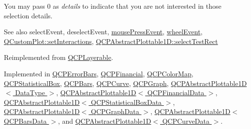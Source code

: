 You may pass 0 as {\itshape details} to indicate that you are not interested in those selection details.

\begin{DoxySeeAlso}{See also}
select\+Event, deselect\+Event, \hyperlink{classQCPLayerable_af6567604818db90f4fd52822f8bc8376}{mouse\+Press\+Event}, \hyperlink{classQCPLayerable_a47dfd7b8fd99c08ca54e09c362b6f022}{wheel\+Event}, \hyperlink{classQCustomPlot_a5ee1e2f6ae27419deca53e75907c27e5}{Q\+Custom\+Plot\+::set\+Interactions}, \hyperlink{classQCPAbstractPlottable1D_a22377bf6e57ab7eedbc9e489250c6ded}{Q\+C\+P\+Abstract\+Plottable1\+D\+::select\+Test\+Rect} 
\end{DoxySeeAlso}


Reimplemented from \hyperlink{classQCPLayerable_a04db8351fefd44cfdb77958e75c6288e}{Q\+C\+P\+Layerable}.



Implemented in \hyperlink{classQCPErrorBars_ac1b6675ef43e32547a3cbcf7b7ac46ed}{Q\+C\+P\+Error\+Bars}, \hyperlink{classQCPFinancial_aac8e91622ac58330fa9ce81cc8fd40ee}{Q\+C\+P\+Financial}, \hyperlink{classQCPColorMap_afb4b843596addf58096082827a9e3450}{Q\+C\+P\+Color\+Map}, \hyperlink{classQCPStatisticalBox_a1607fa92f829c631107c20ccb2d70a6d}{Q\+C\+P\+Statistical\+Box}, \hyperlink{classQCPBars_a121f899c27af3186fe93dcd0eb98f49b}{Q\+C\+P\+Bars}, \hyperlink{classQCPCurve_a0ed9b7e6b4bc72010d6fcd974af46a8b}{Q\+C\+P\+Curve}, \hyperlink{classQCPGraph_a6d669d04462d272c6aa0e5f85846d673}{Q\+C\+P\+Graph}, \hyperlink{classQCPAbstractPlottable1D_a4611b43bcb6441b2154eb4f4e0a33db2}{Q\+C\+P\+Abstract\+Plottable1\+D$<$ Data\+Type $>$}, \hyperlink{classQCPAbstractPlottable1D_a4611b43bcb6441b2154eb4f4e0a33db2}{Q\+C\+P\+Abstract\+Plottable1\+D$<$ Q\+C\+P\+Financial\+Data $>$}, \hyperlink{classQCPAbstractPlottable1D_a4611b43bcb6441b2154eb4f4e0a33db2}{Q\+C\+P\+Abstract\+Plottable1\+D$<$ Q\+C\+P\+Statistical\+Box\+Data $>$}, \hyperlink{classQCPAbstractPlottable1D_a4611b43bcb6441b2154eb4f4e0a33db2}{Q\+C\+P\+Abstract\+Plottable1\+D$<$ Q\+C\+P\+Graph\+Data $>$}, \hyperlink{classQCPAbstractPlottable1D_a4611b43bcb6441b2154eb4f4e0a33db2}{Q\+C\+P\+Abstract\+Plottable1\+D$<$ Q\+C\+P\+Bars\+Data $>$}, and \hyperlink{classQCPAbstractPlottable1D_a4611b43bcb6441b2154eb4f4e0a33db2}{Q\+C\+P\+Abstract\+Plottable1\+D$<$ Q\+C\+P\+Curve\+Data $>$}.

\mbox{\label{classQCPAbstractPlottable_a089d6b5577120239b55c39ed27c39536}} 
